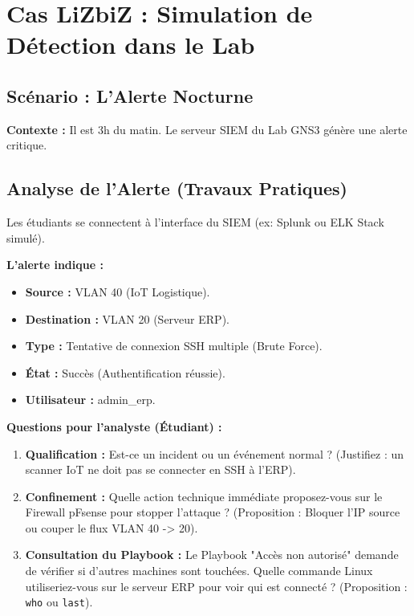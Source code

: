 \section{Cas LiZbiZ : Simulation de Détection dans le Lab}

\subsection{Scénario : L'Alerte Nocturne}

\begin{boxlizbiz}
\textbf{Contexte :} Il est 3h du matin. Le serveur SIEM du Lab GNS3 génère une alerte critique.
\end{boxlizbiz}

\subsection{Analyse de l'Alerte (Travaux Pratiques)}

Les étudiants se connectent à l'interface du SIEM (ex: Splunk ou ELK Stack simulé).

\textbf{L'alerte indique :}
\begin{itemize}
    \item \textbf{Source :} VLAN 40 (IoT Logistique).
    \item \textbf{Destination :} VLAN 20 (Serveur ERP).
    \item \textbf{Type :} Tentative de connexion SSH multiple (Brute Force).
    \item \textbf{État :} Succès (Authentification réussie).
    \item \textbf{Utilisateur :} admin\_erp.
\end{itemize}

\textbf{Questions pour l'analyste (Étudiant) :}
\begin{enumerate}
    \item \textbf{Qualification :} Est-ce un incident ou un événement normal ? (Justifiez : un scanner IoT ne doit pas se connecter en SSH à l'ERP).
    \item \textbf{Confinement :} Quelle action technique immédiate proposez-vous sur le Firewall pFsense pour stopper l'attaque ? (Proposition : Bloquer l'IP source ou couper le flux VLAN 40 -> 20).
    \item \textbf{Consultation du Playbook :} Le Playbook "Accès non autorisé" demande de vérifier si d'autres machines sont touchées. Quelle commande Linux utiliseriez-vous sur le serveur ERP pour voir qui est connecté ? (Proposition : \texttt{who} ou \texttt{last}).
\end{enumerate}

